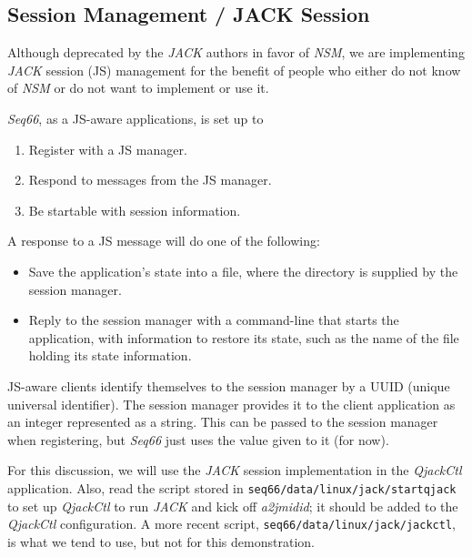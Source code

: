 \subsection{Session Management / JACK Session}
\label{subsec:sessions_jack}

   Although deprecated by the \textsl{JACK} authors in favor of \textsl{NSM},
   we are implementing \textsl{JACK} session (JS) management for the benefit of
   people who either do not know of \textsl{NSM} or do not want to implement or
   use it.

   \textsl{Seq66}, as a JS-aware applications, is set up to

   \begin{enumerate}
      \item Register with a JS manager.
      \item Respond to messages from the JS manager.
      \item Be startable with session information.
   \end{enumerate}

   A response to a JS message will do one of the following:

   \begin{itemize}
      \item Save the application's state into a file, where the directory is
         supplied by the session manager.
      \item Reply to the session manager with a command-line that starts the
         application, with information to restore its state, such as
         the name of the file holding its state information.
   \end{itemize}

	JS-aware clients identify themselves to the session manager by a UUID
	(unique universal identifier). The session manager provides it to
	the client application as an integer represented as a string.
   This can be passed to the session manager when registering, but
   \textsl{Seq66} just uses the value given to it (for now).


   For this discussion, we will use the \textsl{JACK} session implementation in
   the \textsl{QjackCtl} application.
   Also, read the script stored in
   \texttt{seq66/data/linux/jack/startqjack} to set up
   \textsl{QjackCtl} to run \textsl{JACK} and kick off
   \textsl{a2jmidid}; it should be added to the \textsl{QjackCtl}
   configuration.
   A more recent script,
   \texttt{seq66/data/linux/jack/jackctl}, is what we tend to use, but not
   for this demonstration.

